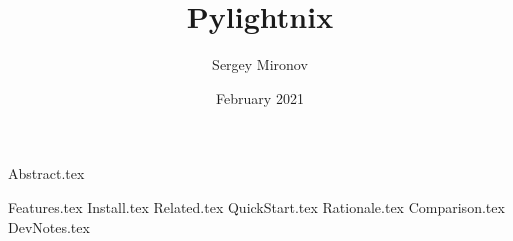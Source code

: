\documentclass{article}
\begin{document}

\title{Pylightnix}
\author{Sergey Mironov}
\date{February 2021}
\maketitle

{Abstract.tex}

{Features.tex}
{Install.tex}
{Related.tex}
{QuickStart.tex}
{Rationale.tex}
{Comparison.tex}
{DevNotes.tex}
\end{document}
